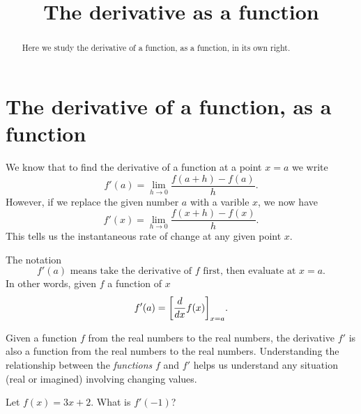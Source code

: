 \documentclass{ximera}
\title[Dig-in:]{The derivative as a function}
\begin{document}
\begin{abstract}
Here we study the derivative of a function, as a function, in its own
right.
\end{abstract}
\maketitle

\section{The derivative of a function, as a function}


We know that to find the derivative of a function at a point $x=a$ we
write
\[
f'(a) = \lim_{h\to 0}\frac{f(a+h)-f(a)}{h}.
\]
However, if we replace the given number $a$ with a varible $x$, we now
have
\[
f'(x) = \lim_{h\to 0}\frac{f(x+h)-f(x)}{h}.
\]
This tells us the instantaneous rate of change at any given point $x$.
\begin{warning}
  The notation
  \[
  \text{$f'(a)$ means take the derivative of $f$ first, then evaluate
    at $x=a$.}
  \]
  In other words, given $f$ a function of $x$
  \[
  f'(a) = \bigg[ \frac{d}{dx} f(x) \bigg]_{x=a}.
  \]
\end{warning}
Given a function $f$ from the real numbers to the real numbers, the
derivative $f'$ is also a function from the real numbers to the real
numbers. Understanding the relationship between the \textit{functions}
$f$ and $f'$ helps us understand any situation (real or imagined)
involving changing values. 

\begin{question}
  Let $f(x) = 3x+2$. What is $f'(-1)$?
  \begin{multipleChoice}
  \end{multipleChoice}
\end{question}
\end{document}
